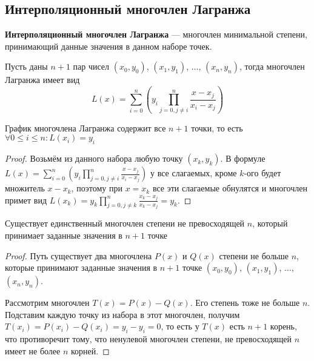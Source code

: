 \subsection{Интерполяционный многочлен Лагранжа}
\textbf{Интерполяционный многочлен Лагранжа} — многочлен минимальной степени, принимающий данные значения в данном наборе точек.

Пусть даны $n+1$ пар чисел $(x_0, y_0)$, $(x_1, y_1)$, $\ldots$, $(x_n, y_n)$, тогда многочлен Лагранжа имеет вид 
$$
L(x) = \sum\limits_{i=0}^n(y_i \prod\limits_{j=0, j \neq i}^n \frac{x - x_j}{x_i - x_j})
$$

График многочлена Лагранжа содержит все $n+1$ точки, то есть $\forall 0 \leq i \leq n : L(x_i) = y_i$ 
\begin{proof}
	Возьмём из данного набора любую точку $(x_k, y_k)$. В формуле $L(x) = \sum\limits_{i=0}^n(y_i \prod\limits_{j=0, j \neq i}^n \frac{x - x_j}{x_i - x_j})$ у все слагаемых, кроме $k$-ого будет множитель $x - x_k$, поэтому при $x = x_k$ все эти слагаемые обнулятся и многочлен примет вид $L(x_k) = y_k \prod\limits_{j=0, j \neq k}^n \frac{x_k - x_j}{x_k - x_j} = y_k$.
\end{proof}

Существует единственный многочлен степени не превосходящей $n$, который принимает заданные значения в $n+1$ точке
\begin{proof}
	Путь существует два многочлена $P(x)$ и $Q(x)$ степени не больше $n$, которые принимают заданные значения в $n+1$ точке $(x_0, y_0)$, $(x_1, y_1)$, $\ldots$, $(x_n, y_n)$.
	
	Рассмотрим многочлен $T(x) = P(x) - Q(x)$. Его степень тоже не больше $n$. Подставим каждую точку из набора в этот многочлен, получим $T(x_i) = P(x_i) - Q(x_i) = y_i - y_i = 0$, то есть у $T(x)$ есть $n + 1$ корень, что противоречит тому, что ненулевой многочлен степени, не превосходящей $n$ имеет не более $n$ корней.
\end{proof}
